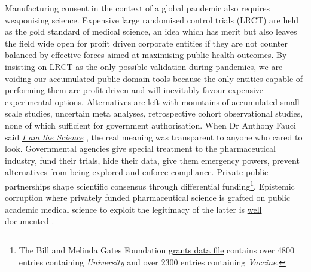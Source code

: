 \documentclass[11pt,a4paper,notitlepage]{report}
\begin{document}
Manufacturing consent in the context of a global pandemic also requires weaponising science. Expensive large randomised control trials (LRCT) are held as the gold standard of medical science, an idea which has merit but also leaves the field wide open for profit driven corporate entities if they are not counter balanced by effective forces aimed at maximising public health outcomes. By insisting on LRCT as the only possible validation during pandemics, we are voiding our accumulated public domain tools because the only entities capable of performing them are profit driven and will inevitably favour expensive experimental options. Alternatives are left with mountains of accumulated small scale studies, uncertain meta analyses, retrospective cohort observational studies, none of which sufficient for government authorisation. When Dr Anthony Fauci said \href{https://www.nationalreview.com/2021/11/anthony-fauci-i-am-the-science/}{\textit{I am the Science}} \cite{nationalreview29112021}, the real meaning was transparent to anyone who cared to look. Governmental agencies give special treatment to the pharmaceutical industry, fund their trials, hide their data, give them emergency powers, prevent alternatives from being explored and enforce compliance. Private public partnerships shape scientific consensus through differential funding\footnote{The Bill and Melinda Gates Foundation \href{https://reporter.nih.gov/search/-bvPCvB7zkyvb1AjAgW5Yg/project-details/8674931}{grants data file} \cite{bmgf-grants} contains over 4800 entries containing \textit{University} and over 2300 entries containing \textit{Vaccine}.}. Epistemic corruption where privately funded pharmaceutical science is grafted on public academic medical science to exploit the legitimacy of the latter is \href{https://www.ncbi.nlm.nih.gov/pmc/articles/PMC8028448/}{well documented} \cite{Sismondo2021-xe}.  
\end{document}
